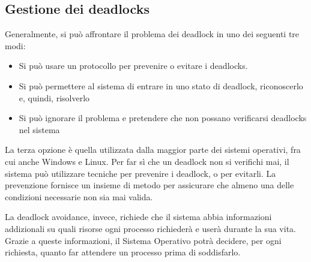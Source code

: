 \documentclass[a4paper]{article}
\begin{document}
\subsection{Gestione dei deadlocks}
Generalmente, si può affrontare il problema dei deadlock in uno dei seguenti tre modi:
\begin{itemize}
    \item Si può usare un protocollo per prevenire o evitare i deadlocks.
    \item Si può permettere al sistema di entrare in uno stato di deadlock, riconoscerlo e, quindi, risolverlo
    \item Si può ignorare il problema e pretendere che non possano verificarsi deadlocks nel sistema
\end{itemize}
La terza opzione è quella utilizzata dalla maggior parte dei sistemi operativi, fra cui anche Windows e Linux.\newline
Per far sì che un deadlock non si verifichi mai, il sistema può utilizzare tecniche per prevenire i deadlock, o per evitarli. La prevenzione fornisce un insieme di metodo per assicurare che almeno una delle condizioni necessarie non sia mai valida.

La deadlock avoidance, invece, richiede che il sistema abbia informazioni addizionali su quali risorse ogni processo richiederà e userà durante la sua vita. Grazie a queste informazioni, il Sistema Operativo potrà decidere, per ogni richiesta, quanto far attendere un processo prima di soddisfarlo.
\end{document}
